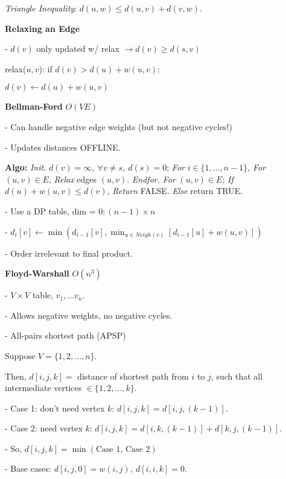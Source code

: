 \documentclass[8pt, letterpaper]{extarticle}
\begin{document}
\begin{minipage}[t]{0.45\textwidth}
\emph{Triangle Inequality}: $d(u,w) \leq d(u,v) + d(v,w)$.

\textbf{Relaxing an Edge}

- $d(v)$ only updated w/ relax $\rightarrow d(v) \geq d(s, v)$

relax($u, v$): if $d(v) > d(u) + w(u, v)$:

\hspace{0.5cm} $d(v) \leftarrow d(u) + w(u, v)$

\textbf{Bellman-Ford} $O(VE)$

- Can handle negative edge weights (but not negative cycles!)

- Updates distances OFFLINE.

{\small \textbf{Algo:}} \emph{Init.} $d(v) = \infty,\ \forall v \neq s,\ d(s) = 0$; \emph{For} $i \in \{1,...,n-1\}$, \emph{For} $(u,v) \in E$, \emph{Relax} edges $(u,v)$. \emph{Endfor.} \emph{For} $(u,v) \in E$; \emph{If } $d(u) + w(u,v) \leq d(v)$, \emph{Return} FALSE. \emph{Else} return TRUE.

- Use a DP table, dim = $0:(n-1) \times n$

- $d_{i}[v] \leftarrow \min(d_{i-1}[v], \min_{u \in Neigh(v)}[d_{i-1}[u] + w(u,v)])$

- Order irrelevant to final product.

\textbf{Floyd-Warshall} $O(n^3)$

- $V \times V$ table, $v_1,...v_n$.

- Allows negative weights, no negative cycles.

- All-pairs shortest path (APSP)

Suppose $V = \{1, 2, \ldots, n\}$. 

Then, $d[i,j,k] = $ distance of shortest path from $i$ to $j$, such that all intermediate vertices $\in \{1, 2, \ldots, k\}$.

- Case 1: don't need vertex $k$: $d[i,j,k] = d[i,j,(k-1)]$.

- Case 2: need vertex $k$: $d[i,j,k] = d[i,k,(k-1)] + d[k,j,(k-1)]$.

- So, $d[i,j,k] = \min(\text{Case 1, Case 2})$

- Base cases: $d[i,j,0] = w(i,j), \ d[i,i,k] = 0$.

\end{minipage}

\newpage
\end{document}
